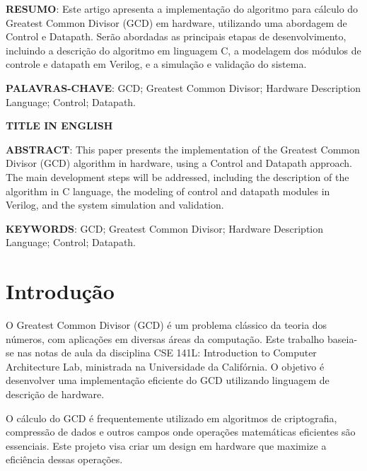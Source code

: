 \documentclass[a4paper,11pt]{article} %
\begin{document}



\vspace{0.5cm}
\noindent\textbf{RESUMO}: Este artigo apresenta a implementação do algoritmo para cálculo do Greatest Common Divisor (GCD) em hardware, utilizando uma abordagem de Control e Datapath. Serão abordadas as principais etapas de desenvolvimento, incluindo a descrição do algoritmo em linguagem C, a modelagem dos módulos de controle e datapath em Verilog, e a simulação e validação do sistema.

\vspace{0.5cm}
\noindent\textbf{PALAVRAS-CHAVE}: GCD; Greatest Common Divisor; Hardware Description Language; Control; Datapath.

\vspace{0.5cm}
 \begin{center}
 \textbf{TITLE IN ENGLISH}
 \end{center}

\noindent\textbf{ABSTRACT}: This paper presents the implementation of the Greatest Common Divisor (GCD) algorithm in hardware, using a Control and Datapath approach. The main development steps will be addressed, including the description of the algorithm in C language, the modeling of control and datapath modules in Verilog, and the system simulation and validation.

\vspace{0.5cm}
\noindent\textbf{KEYWORDS}: GCD; Greatest Common Divisor; Hardware Description Language; Control; Datapath.

\section*{Introdução}

O Greatest Common Divisor (GCD) é um problema clássico da teoria dos números, com aplicações em diversas áreas da computação. Este trabalho baseia-se nas notas de aula da disciplina CSE 141L: Introduction to Computer Architecture Lab, ministrada na Universidade da Califórnia. O objetivo é desenvolver uma implementação eficiente do GCD utilizando linguagem de descrição de hardware.

O cálculo do GCD é frequentemente utilizado em algoritmos de criptografia, compressão de dados e outros campos onde operações matemáticas eficientes são essenciais. Este projeto visa criar um design em hardware que maximize a eficiência dessas operações.
\end{document}
